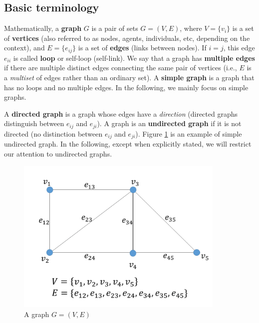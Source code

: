 \documentclass[10.5pt, A4paper, openany, uplatex]{book}
\numberwithin{equation}{section}
\begin{document}
\begin{appendices}
	\section{Basic terminology}
	
	Mathematically, a \textbf{graph} $G$ is a pair of sets $G =(V, E)$, where $V = \{v_i\}$ is a set of \textbf{vertices} (also referred to as nodes, agents, individuals, etc, depending on the context), and $E = \{e_{ij}\}$ is a set of \textbf{edges} (links between nodes).
	If $i = j$, this edge $e_{ii}$ is called \textbf{loop} or self-loop (self-link).
	We say that a graph has \textbf{multiple edges} if there are multiple distinct edges connecting the same pair of vertices (i.e., $E$ is a \textit{multiset} of edges rather than an ordinary set).
	A \textbf{simple graph} is a graph that has no loops and no multiple edges.
	In the following, we mainly focus on simple graphs. 
	
	A \textbf{directed graph} is a graph whose edges have a \textit{direction} (directed graphs distinguish between $e_{ij}$ and $e_{ji}$).
	A graph is an \textbf{undirected graph} if it is not directed (no distinction between $e_{ij}$ and $e_{ji}$).
	Figure \ref{fig:graph} is an example of simple undirected graph.
	In the following, except when explicitly stated, we will restrict our attention to undirected graphs.
	
	\begin{figure}[h!]
		\begin{center}
			\includegraphics[width = 10cm]{graph1.png}
			\caption{A graph $G = (V, E)$\label{fig:graph}}
		\end{center}
	\end{figure}
	

\end{appendices}
\end{document}
